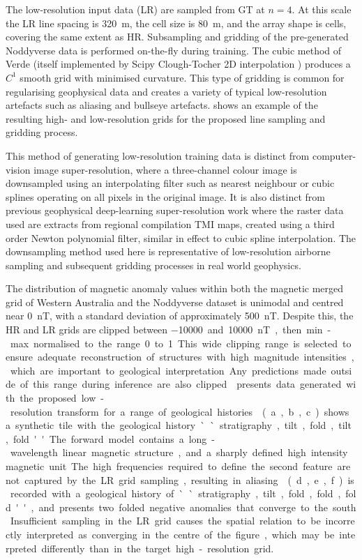 The low-resolution input data (LR) are sampled from GT at \(n = 4\).
At this scale the LR line spacing is \qty{320}{\m}, the cell size is \qty{80}{\m}, and the array shape is  cells, covering the same extent as HR\@.
Subsampling and gridding of the pre-generated Noddyverse data is performed on-the-fly during training.
The cubic method of Verde (itself implemented by Scipy Clough-Tocher 2D interpolation \parencite{2020SciPy-NMeth}) produces a \(C^1\) smooth grid with minimised curvature.
This type of gridding is common for regularising geophysical data and creates a variety of typical low-resolution artefacts such as aliasing and bullseye artefacts.
 shows an example of the resulting high- and low-resolution grids for the proposed line sampling and gridding process.

This method of generating low-resolution training data is distinct from computer-vision image super-resolution, where a three-channel colour image is downsampled using an interpolating filter such as nearest neighbour or cubic splines operating on all pixels in the original image.
It is also distinct from previous geophysical deep-learning super-resolution work \parencite{smithMagneticGridResolution2022} where the raster data used are extracts from regional compilation TMI maps, created using a third order Newton polynomial filter, similar in effect to cubic spline interpolation.
The downsampling method used here is representative of low-resolution airborne sampling and subsequent gridding processes in real world geophysics.

The distribution of magnetic anomaly values within both the magnetic merged grid of Western Australia and the Noddyverse dataset is unimodal and centred near \qty{0}{\nano\tesla}, with a standard deviation of approximately \qty{500}{\nano\tesla}.
Despite this, the HR and LR grids are clipped between \qty{-10000} and \qty{10000}{\nano\tesla}, then min-max normalised to the range 0 to 1.
This wide clipping range is selected to ensure adequate reconstruction of structures with high magnitude intensities, which are important to geological interpretation.
Any predictions made outside of this range during inference are also clipped.

 presents data generated with the proposed low-resolution transform for a range of geological histories.
(a, b, c) shows a synthetic tile with the geological history ``stratigraphy, tilt, fold, tilt, fold''.
The forward model contains a long-wavelength linear magnetic structure, and a sharply defined high intensity magnetic unit.
The high frequencies required to define the second feature are not captured by the LR grid sampling, resulting in aliasing.
(d, e, f) is recorded with a geological history of ``stratigraphy, tilt, fold, fold, fold'', and presents two folded negative anomalies that converge to the south.
Insufficient sampling in the LR grid causes the spatial relation to be incorrectly interpreted as converging in the centre of the figure, which may be interpreted differently than in the target high-resolution grid.

